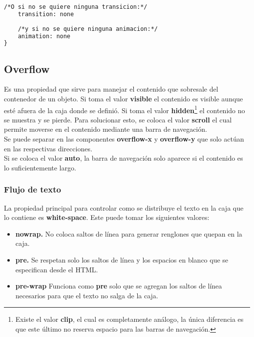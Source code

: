 \documentclass[10pt,oneside]{article}
\begin{document}
\begin{multicols}{2}
\begin{lstlisting}[language=HTML]
    /*O si no se quiere ninguna transicion:*/
    transition: none
    
    /*y si no se quiere ninguna animacion:*/
    animation: none
}     
    \end{lstlisting}

    \subsection{Overflow} 

    Es una propiedad que sirve para manejar el contenido que sobresale del contenedor de un objeto. Si toma el valor \textbf{visible} el contenido es visible aunque esté afuera de la caja donde se definió. Si toma el valor \textbf{hidden}\footnote{Existe el valor \textbf{clip}, el cual es completamente análogo, la única diferencia es que este último no reserva espacio para las barras de navegación.} el contenido no se muestra y se pierde. Para solucionar esto, se coloca el valor \textbf{scroll} el cual permite moverse en el contenido mediante una barra de navegación.\\ \newline Se puede separar en las componentes \textbf{overflow-x} y \textbf{overflow-y} que solo actúan en las respectivas direcciones. \\ \newline Si se coloca el valor \textbf{auto}, la barra de navegación solo aparece si el contenido es lo suficientemente largo. 

\subsubsection{Flujo de texto}

    La propiedad principal para controlar como se distribuye el texto en la caja que lo contiene es \textbf{white-space}. Este puede tomar los siguientes valores:

    \begin{itemize}
        \item \textbf{nowrap.} No coloca saltos de línea para generar renglones que quepan en la caja.
        \item \textbf{pre.} Se respetan solo los saltos de línea y los espacios en blanco que se especifican desde el HTML. 
        \item \textbf{pre-wrap} Funciona como \textbf{pre} solo que se agregan los saltos de línea necesarios para que el texto no salga de la caja. 
    \end{itemize}


\end{multicols}
\end{document}
